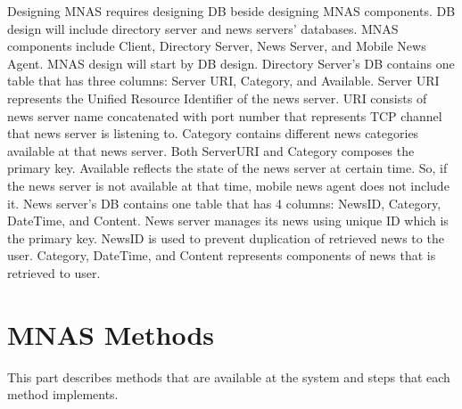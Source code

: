 \documentclass[12pt,a4paper,final,twoside,onecolumn,titlepage]{book}
\begin{document}
Designing \gls{MNAS} requires designing \gls{DB} beside designing \gls{MNAS} components. \gls{DB} design will include directory server and news servers' databases. \gls{MNAS} components include Client, Directory Server, News Server, and Mobile News Agent. \gls{MNAS} design will start by \gls{DB} design. Directory Server's \gls{DB} contains one table that has three columns: Server URI, Category, and Available. Server URI represents the Unified Resource Identifier of the news server. URI consists of news server name concatenated with port number that represents TCP channel that news server is listening to. Category contains different news categories available at that news server. Both ServerURI and Category composes the primary key. Available reflects the state of the news server at certain time. So, if the news server is not available at that time, mobile news agent does not include it. News server's \gls{DB} contains one table that has 4 columns: NewsID, Category, DateTime, and Content. News server manages its news using unique ID which is the primary key.  NewsID is used to prevent duplication of retrieved news to the user. Category, DateTime, and Content represents components of news that is retrieved to user. 

\section{MNAS Methods}
This part describes methods that are available at the system and steps that each method implements.
\end{document}
